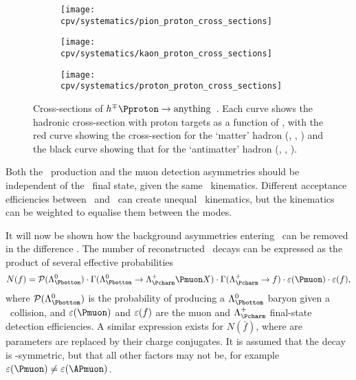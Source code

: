 \begin{figure}
  \begin{subfigure}{0.5\textwidth}
    \centering
    \texttt{[image: cpv/systematics/pion\_proton\_cross\_sections]}
    \caption{}
    \label{fig:cpv:syst:asym:xsecs:pion}
  \end{subfigure}
  \begin{subfigure}{0.5\textwidth}
    \centering
    \texttt{[image: cpv/systematics/kaon\_proton\_cross\_sections]}
    \caption{}
    \label{fig:cpv:syst:asym:xsecs:kaon}
  \end{subfigure}
  \begin{subfigure}{0.5\textwidth}
    \centering
    \texttt{[image: cpv/systematics/proton\_proton\_cross\_sections]}
    \caption{}
    \label{fig:cpv:syst:asym:xsecs:proton}
  \end{subfigure}
  \caption{%
    Cross-sections of $h^{\mp}\Pproton \to \text{anything}$~\cite{PDG2014}.
    Each curve shows the hadronic cross-section with proton targets as a 
    function of \sqrts, with the red curve showing the cross-section for the 
    `matter' hadron (\PKplus, \Ppiplus, \Pproton) and the black curve showing 
    that for the `antimatter' hadron (\PKminus, \Ppiminus, \APproton).
  }
  \label{fig:cpv:syst:asym:xsecs}
\end{figure}

Both the \PLambdab\ production and the muon detection asymmetries should be 
independent of the \PLambdac\ final state, given the same \PLambdac\ 
kinematics.
Different acceptance efficiencies between \pKK\ and \ppipi\ can create unequal 
\PLambdac\ kinematics, but the kinematics can be weighted to equalise them 
between the modes.

It will now be shown how the background asymmetries entering \ARaw\ can be 
removed in the difference \dACP\@.
The number of reconstructed \LcTof\ decays can be expressed as the product of 
several effective probabilities
\begin{equation}
  N(f) = \prob(\PLambdab)\cdot
         \Gamma(\LbToLcmuX)\cdot
         \Gamma(\LcTof)\cdot
         \eff(\Pmuon)\cdot
         \eff(f),
  \label{eqn:cpv:theory:yield}
\end{equation}
where $\prob(\PLambdab)$ is the probability of producing a $\PLambdab$ baryon 
given a \pp\ collision, and $\eff(\Pmuon)$ and $\varepsilon(f)$ are the muon and 
$\PLambdac$ final-state detection efficiencies.
A similar expression exists for $N(\bar{f})$, where are parameters are replaced 
by their charge conjugates.
It is assumed that the \LbToLcmuX decay is \CP-symmetric, but that all other 
factors may not be, for example $\eff(\Pmuon) \neq \eff(\APmuon)$.

